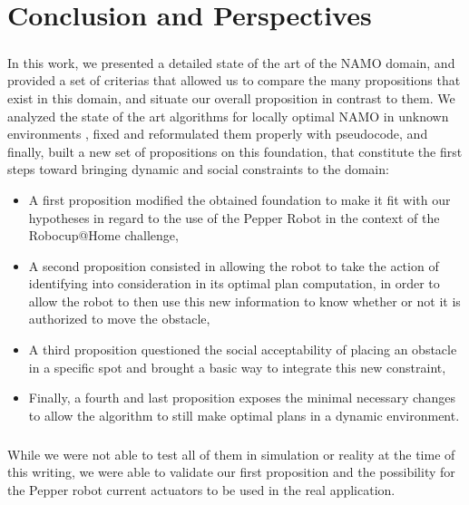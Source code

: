 
\chapter{Conclusion and Perspectives} %

\label{Chapter6} %

\paragraph{} In this work, we presented a detailed state of the art of the NAMO domain, and provided a set of criterias that allowed us to compare the many propositions that exist in this domain, and situate our overall proposition in contrast to them. We analyzed the state of the art algorithms for locally optimal NAMO in unknown environments \parencite{wu_navigation_2010, levihn_locally_2014}, fixed and reformulated them properly with pseudocode, and finally, built a new set of propositions on this foundation, that constitute the first steps toward bringing dynamic and social constraints to the domain:

\begin{itemize}
  \item A first proposition modified the obtained foundation to make it fit with our hypotheses in regard to the use of the Pepper Robot in the context of the Robocup@Home challenge,
  \item A second proposition consisted in allowing the robot to take the action of identifying into consideration in its optimal plan computation, in order to allow the robot to then use this new information to know whether or not it is authorized to move the obstacle,
  \item A third proposition questioned the social acceptability of placing an obstacle in a specific spot and brought a basic way to integrate this new constraint,
  \item Finally, a fourth and last proposition exposes the minimal necessary changes to allow the algorithm to still make optimal plans in a dynamic environment.
\end{itemize}

\paragraph{} While we were not able to test all of them in simulation or reality at the time of this writing, we were able to validate our first proposition and the possibility for the Pepper robot current actuators to be used in the real application.


